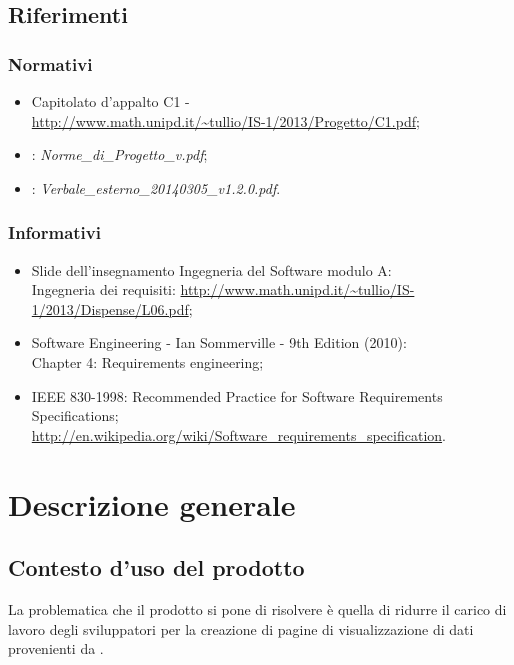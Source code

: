 \subsection{Riferimenti} %
\subsubsection{Normativi} %


\begin{itemize}
\item Capitolato d'appalto C1 - \Progetto{} \\
\url{http://www.math.unipd.it/~tullio/IS-1/2013/Progetto/C1.pdf};
\item {}: \emph{Norme\_{}di\_{}Progetto\_{}v\versioneNormeDiProgetto{}.pdf};\\
\item {}: \emph{Verbale\_esterno\_20140305\_v1.2.0.pdf}.
\end{itemize}

\subsubsection{Informativi} %
\begin{itemize}
\item Slide dell'insegnamento Ingegneria del Software modulo A:\\
Ingegneria dei requisiti: \url{http://www.math.unipd.it/~tullio/IS-1/2013/Dispense/L06.pdf};
\item Software Engineering - Ian Sommerville - 9th Edition (2010):\\
Chapter 4: Requirements engineering;
\item IEEE 830-1998: Recommended Practice for Software Requirements Specifications;\\
\url{http://en.wikipedia.org/wiki/Software_requirements_specification}.

\end{itemize}

\newpage
\section{Descrizione generale}%
\subsection{Contesto d'uso del prodotto} %
La problematica che il prodotto si pone di risolvere è quella di ridurre il carico di lavoro degli sviluppatori per la creazione di pagine  di visualizzazione di dati provenienti da .

